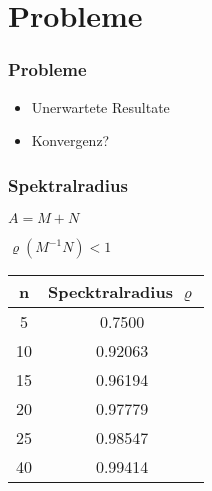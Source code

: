 \section{Probleme}
\begin{frame}
\frametitle{Probleme} 
	\begin{itemize}[<+->]
		\item Unerwartete Resultate
		\item \huge Konvergenz?
	\end{itemize}
\end{frame}


\begin{frame}
\frametitle{Spektralradius}
\centering
		$A = M+N$
		
		$\varrho(M^{-1}N)<1 $

		\begin{table}[h]
			\begin{tabular}{cc}
				n & Specktralradius $\varrho$\\\hline
				5 & 0.7500\\
				10 & 0.92063\\
				15 & 0.96194\\
				20 & 0.97779\\
				25 & 0.98547\\
				40 & 0.99414
			\end{tabular}
			\centering
		\end{table}
\end{frame}